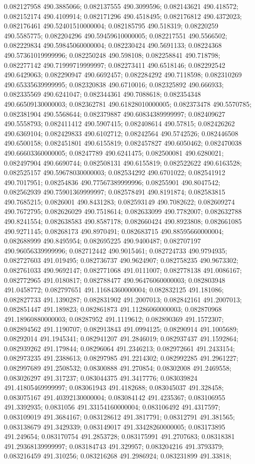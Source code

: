 0.082127958 490.3885066; 0.082137555 490.3099596; 0.082143621 490.418572; 0.082152174 490.4109914; 0.082171296 490.4518495; 0.082176812 490.4372023; 0.082176461 490.52401510000004; 0.082185795 490.518319; 0.08220259 490.5585775; 0.082204296 490.59459610000005; 0.082217551 490.5566502; 0.082229834 490.59845060000004; 0.082230424 490.5691133; 0.08224368 490.57361019999996; 0.082250248 490.598108; 0.082258841 490.718798; 0.082277142 490.71999719999997; 0.082273411 490.6518146; 0.082292542 490.6429063; 0.082290947 490.6692457; 0.082284292 490.7118598; 0.082310269 490.65335639999995; 0.082320838 490.6710016; 0.082325892 490.666933; 0.082335569 490.6241047; 0.082344361 490.7088618; 0.082354348 490.66509130000003; 0.082362781 490.61828010000005; 0.082373478 490.5570785; 0.082381904 490.5568644; 0.082379887 490.60834389999997; 0.082409627 490.5558793; 0.082411412 490.5907415; 0.082408614 490.57815; 0.082426262 490.6369104; 0.082429833 490.6102712; 0.08242564 490.5742526; 0.082446508 490.6500158; 0.082451801 490.6155819; 0.082457827 490.6050462; 0.082470038 490.66603360000005; 0.08247789 490.6241475; 0.082500081 490.6280021; 0.082497904 490.6690744; 0.082508131 490.6155819; 0.082522622 490.6163528; 0.082525157 490.59678030000003; 0.082534292 490.6701022; 0.082541912 490.7017951; 0.08254836 490.77567389999996; 0.08255901 490.8047542; 0.082562939 490.75901369999997; 0.082578491 490.8191874; 0.082583815 490.7685215; 0.0826001 490.8431283; 0.082593149 490.7082622; 0.082609274 490.7672795; 0.082626029 490.7518614; 0.082633099 490.7782007; 0.082632788 490.8241554; 0.082638583 490.8587178; 0.082660424 490.8923808; 0.082661085 490.9271145; 0.08268173 490.8970491; 0.082683715 490.88595660000004; 0.082688999 490.8495954; 0.082695225 490.9400487; 0.082707197 490.96056339999996; 0.082712442 490.9015461; 0.082724733 490.9794935; 0.082727603 491.019495; 0.082736737 490.9624907; 0.082758235 490.9673302; 0.082761033 490.9692147; 0.082771068 491.0111007; 0.082778138 491.0086167; 0.082772965 491.0180817; 0.082788477 490.96476060000003; 0.082803948 491.0458772; 0.082797651 491.11684360000004; 0.082832125 491.181086; 0.082827733 491.1390287; 0.082831902 491.2007013; 0.082842161 491.2007013; 0.082851447 491.189823; 0.082861873 491.11286060000003; 0.082870968 491.18960880000003; 0.08287952 491.1119612; 0.082890369 491.1572307; 0.082894562 491.1190707; 0.082913843 491.0994125; 0.08290914 491.1005689; 0.08292014 491.1945341; 0.082941207 491.2846019; 0.082937437 491.1592864; 0.082939262 491.179844; 0.08296064 491.2346213; 0.082972661 491.2433154; 0.082973235 491.2388613; 0.08297985 491.2214302; 0.082992285 491.2961227; 0.082997689 491.2508532; 0.08300888 491.270854; 0.08302008 491.2469558; 0.083026297 491.317237; 0.083044375 491.3417776; 0.083039824 491.41805469999997; 0.083061943 491.4182688; 0.083045037 491.328458; 0.083075167 491.40392130000004; 0.083084142 491.4235367; 0.083106955 491.3392935; 0.0831056 491.33154160000004; 0.083106492 491.4317597; 0.083109019 491.3684167; 0.083128612 491.3817791; 0.08312791 491.381565; 0.083138679 491.3429339; 0.083149017 491.33428260000005; 0.083173895 491.249654; 0.083170754 491.2853728; 0.083175991 491.2707683; 0.08318381 491.29368139999997; 0.083184743 491.329957; 0.083204216 491.3793379; 0.083216459 491.310256; 0.083216268 491.2986924; 0.083231899 491.33818; 